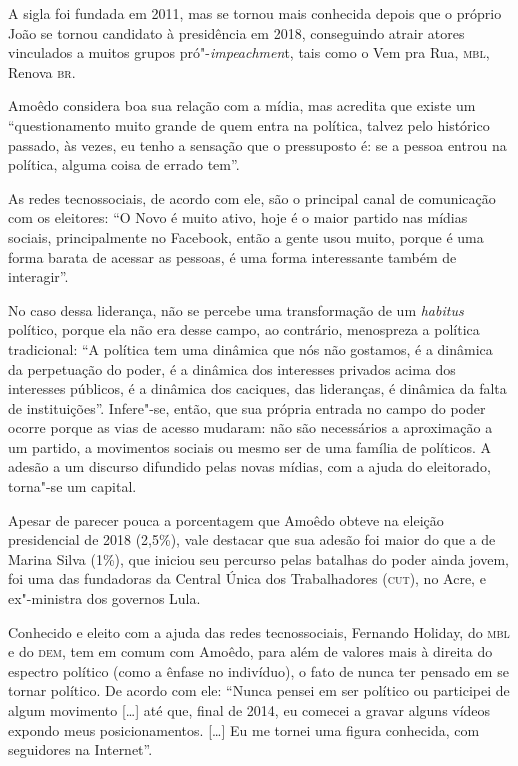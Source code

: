 A sigla foi fundada em 2011, mas se tornou mais conhecida depois que o
próprio João se tornou candidato à presidência em 2018, conseguindo
atrair atores vinculados a muitos grupos pró"-\textit{impeachmen}t, tais
como o Vem pra Rua, \textsc{mbl}, Renova \textsc{br}.

Amoêdo considera boa sua relação com a mídia, mas acredita que existe um
``questionamento muito grande de quem entra na política, talvez pelo
histórico passado, às vezes, eu tenho a sensação que o pressuposto é: se
a pessoa entrou na política, alguma coisa de errado tem''.

As redes tecnossociais, de acordo com ele, são o principal canal de
comunicação com os eleitores: ``O Novo é muito ativo, hoje é o maior
partido nas mídias sociais, principalmente no Facebook, então a
gente usou muito, porque é uma forma barata de acessar as pessoas, é uma
forma interessante também de interagir''.

No caso dessa liderança, não se percebe uma transformação de um
\textit{habitus} político, porque ela não era desse campo, ao contrário,
menospreza a política tradicional: ``A política tem uma dinâmica que nós
não gostamos, é a dinâmica da perpetuação do poder, é a dinâmica dos
interesses privados acima dos interesses públicos, é a dinâmica dos
caciques, das lideranças, é dinâmica da falta de instituições''.
Infere"-se, então, que sua própria entrada no campo do poder ocorre
porque as vias de acesso mudaram: não são necessários a aproximação a um
partido, a movimentos sociais ou mesmo ser de uma família de políticos.
A adesão a um discurso difundido pelas novas mídias, com a ajuda do
eleitorado, torna"-se um capital.

Apesar de parecer pouca a porcentagem que Amoêdo obteve na eleição
presidencial de 2018 (2,5\%), vale destacar que sua adesão foi maior do
que a de Marina Silva (1\%), que iniciou seu percurso pelas batalhas do
poder ainda jovem, foi uma das fundadoras da Central Única dos
Trabalhadores (\textsc{cut}), no Acre, e ex"-ministra dos governos Lula.

Conhecido e eleito com a ajuda das redes tecnossociais, Fernando
Holiday, do \textsc{mbl} e do \textsc{dem}, tem em comum com Amoêdo, para além de valores
mais à direita do espectro político (como a ênfase no indivíduo), o fato
de nunca ter pensado em se tornar político. De acordo com ele: ``Nunca
pensei em ser político ou participei de algum movimento {[}\ldots{}{]} até
que, final de 2014, eu comecei a gravar alguns vídeos expondo meus
posicionamentos. {[}\ldots{}{]} Eu me tornei uma figura conhecida, com
seguidores na Internet''.

